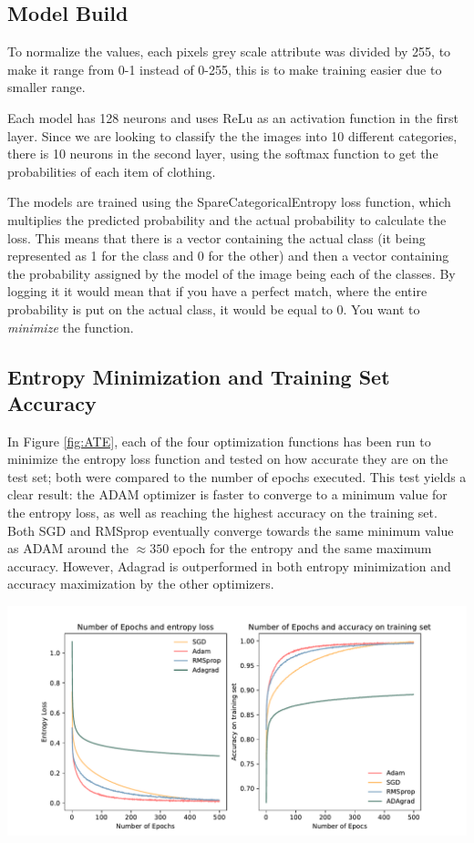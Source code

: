 \documentclass[oneside]{article}
\begin{document}
\subsection{Model Build}
To normalize the values, each pixels grey scale attribute was divided by 255, to make it range from 0-1 instead of 0-255, this is to make training easier due to smaller range.\par
Each model has 128 neurons and uses ReLu as an activation function in the first layer. Since we are looking to classify the the images into 10 different categories, there is 10 neurons in the second layer, using the softmax function to get the probabilities of each item of clothing. \par
The models are trained using the SpareCategoricalEntropy loss function, which multiplies the predicted probability and the actual probability to calculate the loss. This means that there is a vector containing the actual class (it being represented as 1 for the class and 0 for the other) and then a vector containing the probability assigned by the model of the image being each of the classes. By logging it it would mean that if you have a perfect match, where the entire probability is put on the actual class, it would be equal to 0. You want to \textit{minimize} the function. 


\subsection{Entropy Minimization and Training Set Accuracy}
In Figure \ref{fig:ATE}, each of the four optimization functions has been run to minimize the entropy loss function and tested on how accurate they are on the test set; both were compared to the number of epochs executed. This test yields a clear result: the ADAM optimizer is faster to converge to a minimum value for the entropy loss, as well as reaching the highest accuracy on the training set. Both SGD and RMSprop eventually converge towards the same minimum value as ADAM around the $\approx 350$ epoch for the entropy and the same maximum accuracy. However, Adagrad is outperformed in both entropy minimization and accuracy maximization by the other optimizers.
\begin{center}
    \includegraphics[width=1\textwidth]{report/figures/accuracy_training_and_entropy.pdf}
    \label{fig:ATE}\\
\end{center}
\end{document}
